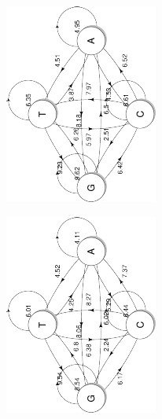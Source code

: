 \documentclass{article}
\begin{document}
\begin{figure}[t]
   \centering
   \begin{subfigure}{.5\textwidth}
      \centering
      \includegraphics[width=.7\textwidth,natwidth=100,natheight=100,angle=270]{hg38.pdf}
      \caption{}
      \label{fig:hg38_transition}
   \end{subfigure}%
   \begin{subfigure}{.5\textwidth}
      \centering
      \includegraphics[width=.7\textwidth,natwidth=100,natheight=100,angle=270]{mm10.pdf}

\end{subfigure}
\end{figure}
\end{document}
